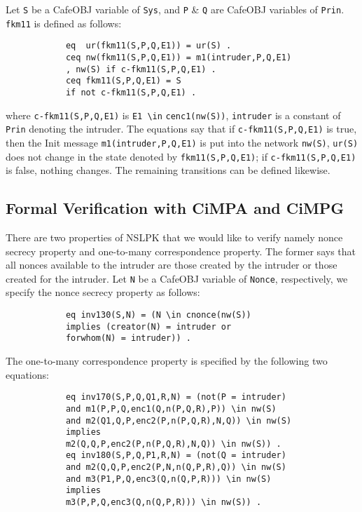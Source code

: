\documentclass[10pt, conference, compsocconf]{IEEEtran}
\begin{document}
	Let \verb!S! be a CafeOBJ variable of \verb!Sys!, and \verb!P! \& \verb!Q! are CafeOBJ variables of \verb!Prin!.
	\verb!fkm11! is defined as follows:
	\begin{small}
		\begin{verbatim}
			eq  ur(fkm11(S,P,Q,E1)) = ur(S) .
			ceq nw(fkm11(S,P,Q,E1)) = m1(intruder,P,Q,E1)
			, nw(S) if c-fkm11(S,P,Q,E1) .
			ceq fkm11(S,P,Q,E1) = S 
			if not c-fkm11(S,P,Q,E1) .
		\end{verbatim}
	\end{small}
	
	\noindent
	where \verb!c-fkm11(S,P,Q,E1)! is \verb!E1 \in! \verb!cenc1(nw(S))!, 
	\verb!intruder! is a constant of \verb!Prin! denoting the intruder. The equations say that if \verb!c-fkm11(S,P,Q,E1)! is true, then the Init message \verb!m1(intruder,P,Q,E1)! is put into the network \verb!nw(S)!, \verb!ur(S)! does not change in the state denoted by \verb!fkm11(S,P,Q,E1)!; if \verb!c-fkm11(S,P,Q,E1)! is false, nothing changes. The remaining transitions can be defined likewise.
	
	
	
	\subsection{Formal Verification with CiMPA and CiMPG}
	There are two properties of NSLPK that we would like to verify namely nonce secrecy property and one-to-many correspondence property.
	The former says that all nonces available to the intruder are those created by the intruder or those created for the intruder. Let \verb!N! be a CafeOBJ variable of \verb!Nonce!, respectively, we specify the nonce secrecy property as follows:
	
	\begin{small}
		\begin{verbatim}
			eq inv130(S,N) = (N \in cnonce(nw(S)) 
			implies (creator(N) = intruder or 
			forwhom(N) = intruder)) .
		\end{verbatim}
	\end{small}
	
	The one-to-many correspondence property is specified by the following two equations:
	\begin{small}
		\begin{verbatim}
			eq inv170(S,P,Q,Q1,R,N) = (not(P = intruder)
			and m1(P,P,Q,enc1(Q,n(P,Q,R),P)) \in nw(S) 
			and m2(Q1,Q,P,enc2(P,n(P,Q,R),N,Q)) \in nw(S)
			implies 
			m2(Q,Q,P,enc2(P,n(P,Q,R),N,Q)) \in nw(S)) .
			eq inv180(S,P,Q,P1,R,N) = (not(Q = intruder)
			and m2(Q,Q,P,enc2(P,N,n(Q,P,R),Q)) \in nw(S)
			and m3(P1,P,Q,enc3(Q,n(Q,P,R))) \in nw(S)
			implies
			m3(P,P,Q,enc3(Q,n(Q,P,R))) \in nw(S)) .
		\end{verbatim}
	\end{small}
	
\end{document}

